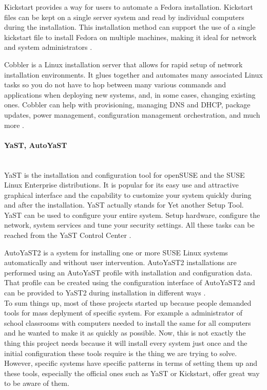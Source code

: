 \documentclass[thesis=B,english]{FITthesis}[2013/04/26]
\newcommand{\myparagraph}[1]{\paragraph{#1}\mbox{}\\}
\begin{document}
Kickstart provides a way for users to automate a Fedora installation. Kickstart files can be kept on a single server system and read by individual computers during the installation. This installation method can support the use of a single kickstart file to install Fedora on multiple machines, making it ideal for network and system administrators \cite{kickstart}.

Cobbler is a Linux installation server that allows for rapid setup of network installation environments. It glues together and automates many associated Linux tasks so you do not have to hop between many various commands and applications when deploying new systems, and, in some cases, changing existing ones. Cobbler can help with provisioning, managing DNS and DHCP, package updates, power management, configuration management orchestration, and much more \cite{cobbler}.

\myparagraph{YaST, AutoYaST}

YaST is the installation and configuration tool for openSUSE and the SUSE Linux Enterprise distributions. It is popular for its easy use and attractive graphical interface and the capability to customize your system quickly during and after the installation. YaST actually stands for Yet another Setup Tool. YaST can be used to configure your entire system. Setup hardware, configure the network, system services and tune your security settings. All these tasks can be reached from the YaST Control Center \cite{yast}.

AutoYaST2 is a system for installing one or more SUSE Linux systems automatically and without user intervention. AutoYaST2 installations are performed using an AutoYaST profile with installation and configuration data. That profile can be created using the configuration interface of AutoYaST2 and can be provided to YaST2 during installation in different ways \cite{autoyast}. \\

To sum things up, most of these projects started up because people demanded tools for mass deplyment of specific system. For example a administrator of school classrooms with computers needed to install the same for all computers and he wanted to make it as quickly as possible. Now, this is not exactly the thing this project needs because it will install every system just once and the initial configuration these tools require is the thing we are trying to solve. However, specific systems have specific patterns in terms of setting them up and these tools, especially the official ones such as YaST or Kickstart, offer great way to be aware of them.
\end{document}
